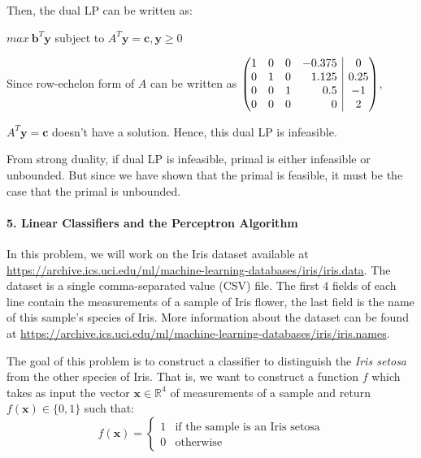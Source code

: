 \documentclass[11pt]{article}
\makeatletter
\newenvironment{redmatrix}
  {\left(\array{@{}rrrr|c@{}}}
  {\endarray\right)}
\newcommand{\bx}{\mathbf{x}}
\newcommand{\by}{\mathbf{y}}
\makeatother
\begin{document}
Then, the dual LP can be written as:

$max \ \textbf{b}^T \by$ subject to $A^T \by = \textbf{c}, \by \geq 0$

Since row-echelon form of $A$ can be written as
$
\begin{redmatrix}
1&0&0&-0.375&0\\
0&1&0&1.125&0.25\\
0&0&1&0.5&-1\\
0&0&0&0&2
\end{redmatrix}
$,

$A^T \by = \textbf{c}$ doesn't have a solution. Hence, this dual LP is infeasible.

From strong duality, if dual LP is infeasible, primal is either infeasible or unbounded. But since we have shown that the primal is feasible, it must be the case that the primal is unbounded.
\color{black}

\paragraph{5. Linear Classifiers and the Perceptron Algorithm}

In this problem, we will work on the Iris dataset available at
\url{https://archive.ics.uci.edu/ml/machine-learning-databases/iris/iris.data}.
The dataset is a single comma-separated value (CSV) file. The first 4 fields of
each line contain the measurements of a sample of Iris flower, the
last field is the name of this sample's species of Iris. More information about
the dataset can be found at
\url{https://archive.ics.uci.edu/ml/machine-learning-databases/iris/iris.names}.

The goal of this problem is to construct a classifier to distinguish the
\emph{Iris setosa} from the other species of Iris. That is, we want to construct
a function $f$ which takes as input the vector $\bx\in\mathbb{R}^4$ of
measurements of a sample and return $f(\bx)\in\{0,1\}$ such that:
\begin{displaymath}
    f(\bx) = \begin{cases}
        1& \text{if the sample is an Iris setosa}\\
        0& \text{otherwise}
    \end{cases}
\end{displaymath}
\end{document}
